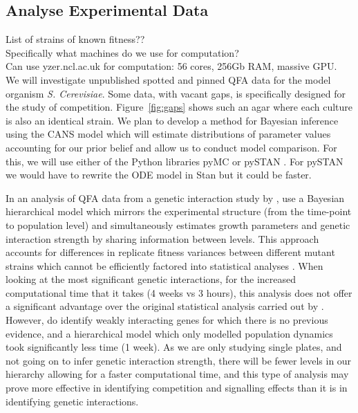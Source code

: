 \subsection{Analyse Experimental Data}
\label{sec:analyse-data}

List of strains of known fitness??\\
Specifically what machines do we use for computation?\\
Can use yzer.ncl.ac.uk for computation: 56 cores, 256Gb RAM, massive GPU.\\

We will investigate unpublished spotted and pinned QFA data for the
model organism \textit{S. Cerevisiae}. Some data, with vacant gaps, is
specifically designed for the study of
competition. Figure~\ref{fig:gaps} shows such an agar where each
culture is also an identical strain. We plan to develop a method for
Bayesian inference using the CANS model which will estimate
distributions of parameter values accounting for our prior belief and
allow us to conduct model comparison. For this, we will use either of
the Python libraries pyMC \citep{PyMC2010} or pySTAN \citep{Stan}. For
pySTAN we would have to rewrite the ODE model in Stan but it
could be faster.

In an analysis of QFA data from a genetic interaction study by
\citet{Addinall2011}, \citet{Heydari2016} use a Bayesian hierarchical
model which mirrors the experimental structure (from the time-point to
population level) and simultaneously estimates growth parameters and
genetic interaction strength by sharing information between
levels. This approach accounts for differences in replicate fitness
variances between different mutant strains which cannot be efficiently
factored into statistical analyses \citep{Heydari2016}. When looking
at the most significant genetic interactions, for the increased
computational time that it takes (4 weeks vs 3 hours), this analysis
does not offer a significant advantage over the original statistical
analysis carried out by \citet{Addinall2011}. However,
\citet{Heydari2016} do identify weakly interacting genes for which
there is no previous evidence, and a hierarchical model which only
modelled population dynamics took significantly less time (1 week). As
we are only studying single plates, and not going on to infer genetic
interaction strength, there will be fewer levels in our hierarchy
allowing for a faster computational time, and this type of analysis
may prove more effective in identifying competition and signalling
effects than it is in identifying genetic interactions.


